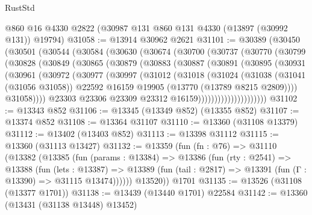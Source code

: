 \begin{lexlean}{RustStd}
\begin{coremodule}
    @860
    @16
    @4330
    @2822
    (@30987 @131 @860 @131 @4330 (@13897 (@30992 @131)) @19794)
@31058 := @13914 @30962 @2621
@31101 := @30389
    (@30450
      (@30501
        (@30544
          (@30584
            (@30630
              (@30674
                (@30700
                  (@30737
                    (@30770
                      (@30799
                        (@30828
                          (@30849
                            (@30865
                              (@30879
                                (@30883
                                  (@30887
                                    (@30891
                                      (@30895
                                        (@30931
                                          (@30961
                                            (@30972
                                              (@30977
                                                (@30997
                                                  (@31012
                                                    (@31018
                                                      (@31024
                                                        (@31038
                                                          (@31041 (@31056 @31058))
                                                          @22592
                                                          @16159
                                                          @19905
                                                          (@13770 (@13789 @8215 @2809))))
                                                      @31058))))
                                              @23303
                                              @23306
                                              @23309
                                              @23312
                                              @16159)))))))))))))))))))))
@31102 := @13343 @852
@31106 := @13345 (@13349 @852) (@13355 @852)
@31107 := @13374 @852
@31108 := @13364 @31107
@31110 := @13360 (@31108 @13379)
@31112 := @13402 (@13403 @852)
@31113 := @13398 @31112
@31115 := @13360 (@31113 @13427)
@31132 := @13359
    (fun (fn : @76) =>
    @31110
      (@13382
        (@13385
          (fun (params : @13384) =>
          @13386
            (fun (rty : @2541) =>
            @13388
              (fun (lets : @13387) =>
              @13389 (fun (tail : @2817) => @13391 (fun (Γ : @13390) => @31115 @13474))))))
        @13520))
    @1701
@31135 := @13526 (@31108 (@13377 @1701))
@31138 := @13439 (@13440 @1701) @22584
@31142 := @13360 (@13431 (@31138 @13448) @13452)

\end{coremodule}
\end{lexlean}
